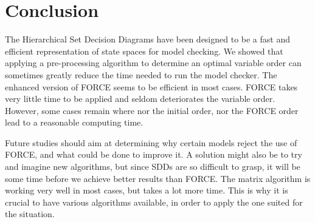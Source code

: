 \documentclass[12pt]{report}
\begin{document}
\newpage
\section*{Conclusion} %

The Hierarchical Set Decision Diagrams have been designed to be a fast and efficient representation of state spaces for model checking. We showed that applying a pre-processing algorithm to determine an optimal variable order can sometimes greatly reduce the time needed to run the model checker. The enhanced version of FORCE seems to be efficient in most cases. FORCE takes very little time to be applied and seldom deteriorates the variable order. However, some cases remain where nor the initial order, nor the FORCE order lead to a reasonable computing time.

Future studies should aim at determining why certain models reject the use of FORCE, and what could be done to improve it. A solution might also be to try and imagine new algorithms, but since SDDs are so difficult to grasp, it will be some time before we achieve better results than FORCE. The matrix algorithm is working very well in most cases, but takes a lot more time. This is why it is crucial to have various algorithms available, in order to apply the one suited for the situation.

\printbibliography
\end{document}
